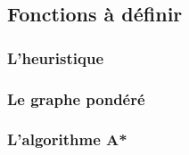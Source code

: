 \newpage
\subsection{Fonctions à définir}
\subsubsection{L'heuristique}

\vspace{10cm}



\subsubsection{Le graphe pondéré}

\vspace{10cm}



\subsubsection{L'algorithme A*}




